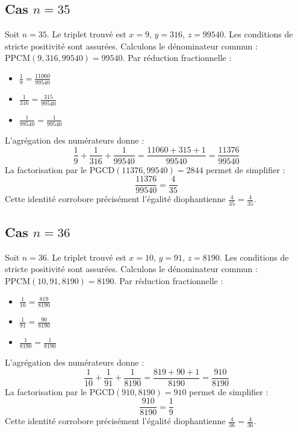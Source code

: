 \documentclass[11pt,a4paper]{article}
\begin{document}
\subsection{Cas $n = 35$}
Soit $n = 35$. Le triplet trouvé est $x = 9$, $y = 316$, $z = 99540$.
Les conditions de stricte positivité sont assurées.
Calculons le dénominateur commun : $\text{PPCM}(9, 316, 99540) = 99540$.
Par réduction fractionnelle :
\begin{itemize}
    \item $\frac{1}{9} = \frac{11060}{99540}$
    \item $\frac{1}{316} = \frac{315}{99540}$
    \item $\frac{1}{99540} = \frac{1}{99540}$
\end{itemize}
L'agrégation des numérateurs donne :
$$ \frac{1}{9} + \frac{1}{316} + \frac{1}{99540} = \frac{11060 + 315 + 1}{99540} = \frac{11376}{99540} $$
La factorisation par le $\text{PGCD}(11376, 99540) = 2844$ permet de simplifier :
$$ \frac{11376}{99540} = \frac{4}{35} $$
Cette identité corrobore précisément l'égalité diophantienne $\frac{4}{35} = \frac{4}{35}$.

\subsection{Cas $n = 36$}
Soit $n = 36$. Le triplet trouvé est $x = 10$, $y = 91$, $z = 8190$.
Les conditions de stricte positivité sont assurées.
Calculons le dénominateur commun : $\text{PPCM}(10, 91, 8190) = 8190$.
Par réduction fractionnelle :
\begin{itemize}
    \item $\frac{1}{10} = \frac{819}{8190}$
    \item $\frac{1}{91} = \frac{90}{8190}$
    \item $\frac{1}{8190} = \frac{1}{8190}$
\end{itemize}
L'agrégation des numérateurs donne :
$$ \frac{1}{10} + \frac{1}{91} + \frac{1}{8190} = \frac{819 + 90 + 1}{8190} = \frac{910}{8190} $$
La factorisation par le $\text{PGCD}(910, 8190) = 910$ permet de simplifier :
$$ \frac{910}{8190} = \frac{1}{9} $$
Cette identité corrobore précisément l'égalité diophantienne $\frac{4}{36} = \frac{4}{36}$.
\end{document}
